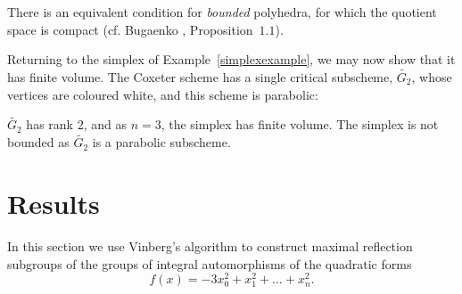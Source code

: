\documentclass[smallcondensed]{svjour3}                     %
\begin{document}
There is an equivalent condition for \emph{bounded} polyhedra, for which the quotient space is compact (cf. Bugaenko \cite{bugaenko92}, Proposition~$1.1$).

\begin{example}
Returning to the simplex of Example~\ref{simplexexample}, we may now show that it has finite volume. The Coxeter scheme has a single critical subscheme, $\tilde{G_2}$, whose vertices are coloured white, and this scheme is parabolic:
\begin{figure}[h!]
  \centering
\end{figure}

$\tilde{G_2}$ has rank $2$, and as $n=3$, the simplex has finite volume. The simplex is not bounded as $\tilde{G_2}$ is a parabolic subscheme.
\end{example}

\section{Results}\label{results}
In this section we use Vinberg's algorithm to construct maximal reflection subgroups of the groups of integral automorphisms of the quadratic forms
\begin{equation}
f(x) = -3x_0^2 + x_1^2 + \ldots + x_n^2.
\end{equation}
\end{document}
